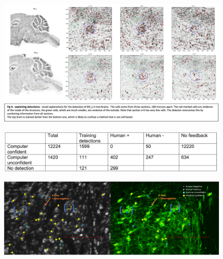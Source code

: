 \documentclass[runningheads]{llncs}
\begin{document}
\begin{figure}[t]
  \includegraphics[width=\textwidth]{figures/DetectionsExplanations.png}
  \caption{}
\end{figure}

\begin{figure}[t]
  \includegraphics[width=\textwidth]{figures/MarkedCellsDetectionNumbers.png}
  \caption{}
\end{figure}

\begin{figure}[t]
  \includegraphics[width=\textwidth]{figures/Marked_cell_detections.png}
  \caption{}
\end{figure}
\end{document}
